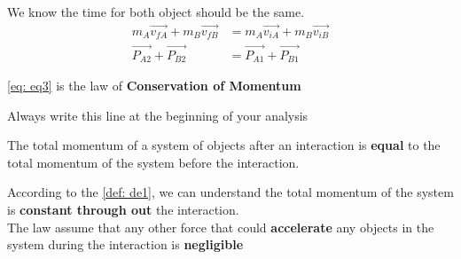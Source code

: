 We know the time for both object should be the same.
\begin{align}
    m_A \vec{v_{fA}} + m_B \vec{v_{fB}} &= m_A \vec{v_{iA}} + m_B \vec{v_{iB}} \nonumber\\
    \vec{P_{A2}} + \vec{P_{B2}} &= \vec{P_{A1}} + \vec{P_{B1}} \label{eq: eq3}
\end{align}

\ref{eq: eq3} is the law of \textbf{Conservation of Momentum}

Always write this line at the beginning of your analysis

\begin{definition} \label{def: de1}
     The total momentum of a system of objects after an interaction is 
    \textbf{equal} to the total momentum of the system before the interaction. 
\end{definition}

According to the \ref{def: de1}, we can understand the total momentum of the system is \textbf{constant through out}
the interaction. \\

The law assume that any other force that could \textbf{accelerate} any objects in the system during the 
interaction is \textbf{negligible}
